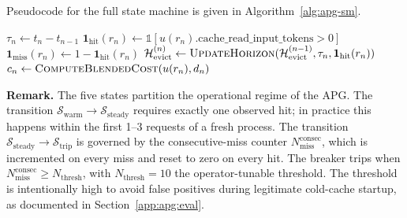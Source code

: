 Pseudocode for the full state machine is given in
Algorithm~\ref{alg:apg-sm}.

\begin{algorithm}[ht]
\caption{Asymmetric Prefill Gateway: top-level state machine.}
\label{alg:apg-sm}
\SetAlgoLined
{}

\BlankLine
$\tau_n \leftarrow t_n - t_{n-1}$\;
$\mathbf{1}_{\text{hit}}(r_n) \leftarrow \mathbb{1}[u(r_n).\mathrm{cache\_read\_input\_tokens} > 0]$\;
$\mathbf{1}_{\text{miss}}(r_n) \leftarrow 1 - \mathbf{1}_{\text{hit}}(r_n)$\;
$\mathcal{H}_{\text{evict}}^{(n)} \leftarrow \textsc{UpdateHorizon}(\mathcal{H}_{\text{evict}}^{(n-1)}, \tau_n, \mathbf{1}_{\text{hit}}(r_n))$\;
\BlankLine
{}
\BlankLine
$c_n \leftarrow \textsc{ComputeBlendedCost}(u(r_n), d_n)$\;
\;
\end{algorithm}

\noindent
\textbf{Remark.} The five states partition the operational regime of
the APG. The transition $\mathcal{S}_{\text{warm}} \to
\mathcal{S}_{\text{steady}}$ requires exactly one observed hit; in
practice this happens within the first 1--3 requests of a fresh
process. The transition $\mathcal{S}_{\text{steady}} \to
\mathcal{S}_{\text{trip}}$ is governed by the consecutive-miss
counter $N_{\text{miss}}^{\text{consec}}$, which is incremented on
every miss and reset to zero on every hit. The breaker trips when
$N_{\text{miss}}^{\text{consec}} \ge N_{\text{thresh}}$, with
$N_{\text{thresh}} = 10$ the operator-tunable threshold. The
threshold is intentionally high to avoid false positives during
legitimate cold-cache startup, as documented in
Section~\ref{app:apg:eval}.

